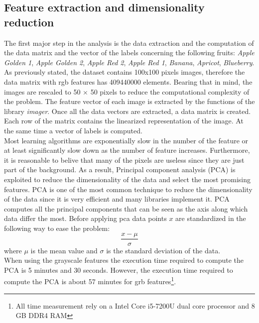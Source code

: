 \documentclass{article}
\begin{document}
\subsection{Feature extraction and dimensionality reduction}
The first major step in the analysis is the data extraction and the computation of the data matrix and the vector of the labels concerning the following fruits: \textit{Apple Golden 1}, \textit{Apple Golden 2}, \textit{Apple Red 2}, \textit{Apple Red 1}, \textit{Banana}, \textit{Apricot}, \textit{Blueberry}. \\
As previously stated, the dataset contains 100x100 pixels images, therefore the data matrix with rgb features has 409440000 elements. Bearing that in mind, the images are rescaled to 50 $\times$ 50 pixels to reduce the computational complexity of the problem. 
The feature vector of each image is extracted by the functions of the library \textit{imager}. Once all the data vectors are extracted, a data matrix is created. Each row of the matrix contains the linearized representation of the image. At the same time a vector of labels is computed.\\
Most learning algorithms are exponentially slow in the number of the feature or at least significantly slow down as the number of feature increases. Furthermore, it is reasonable to belive that many of the pixels are useless since they are just part of the background. As a result, Principal component analysis (PCA) is exploited to reduce the dimensionality of the data and select the most promising features. PCA is one of the most common technique to reduce the dimensionality of the data since it is very efficient and many libraries implement it. PCA computes all the principal components that can be seen as the axis along which data differ the most. Before applying pca data points $x$ are standardized in the following way to ease the problem:
\begin{equation}
 \frac{x - \mu}{\sigma}
\end{equation}
\noindent where $\mu$ is the mean value and $\sigma$ is the standard deviation of the data. \\
When using the grayscale features the execution time required to compute the PCA is 5 minutes and 30 seconds. However, the execution time required to compute the PCA is about 57 minutes for grb features\footnote{All time measurement rely on a Intel Core i5-7200U dual core processor and 8 GB DDR4 RAM}.
\end{document}
